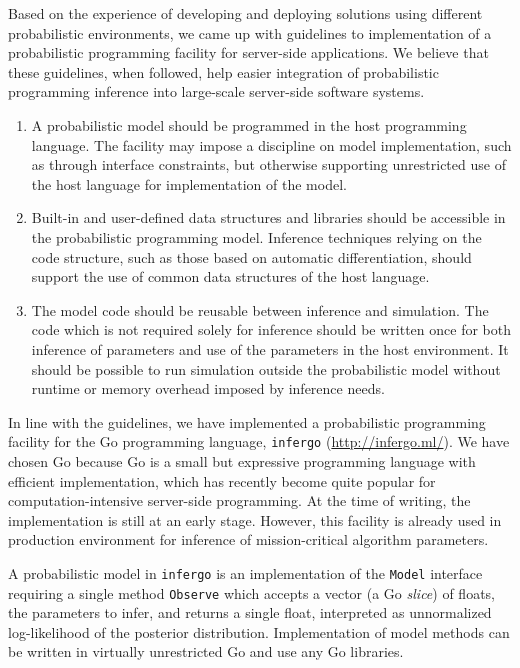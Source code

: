 \documentclass[sigplan,review]{acmart}\settopmatter{printfolios=true,printccs=false,printacmref=false}
\begin{document}
\begin{sloppypar}
Based on the experience of developing and deploying solutions
using different probabilistic environments, we came up with
guidelines to implementation of a probabilistic programming
facility for server-side applications. We believe that these
guidelines, when followed, help easier integration of
probabilistic programming inference into large-scale server-side
software systems.

\begin{enumerate}
\item A probabilistic model should be programmed in the host
programming language. The facility may impose a discipline on
model implementation, such as through interface constraints, but
otherwise supporting unrestricted use of the host language for
implementation of the model.

\item Built-in and user-defined data structures and libraries
should be accessible in the probabilistic programming model.
Inference techniques relying on the code structure, such as
those based on automatic differentiation, should support the
use of common data structures of the host language.

\item The model code should be reusable between inference and
simulation. The code which is not required solely for inference
should be written once for both inference of parameters and use
of the parameters in the host environment.  It should be
possible to run simulation outside the probabilistic model without
runtime or memory overhead imposed by inference needs.
\end{enumerate}

In line with the guidelines, we have implemented a probabilistic
programming facility for the Go programming language,
\texttt{infergo} (\url{http://infergo.ml/}). We have chosen Go
because Go is a small but expressive programming language with
efficient implementation, which has recently become quite
popular for computation-intensive server-side programming. At
the time of writing, the implementation is still at an early
stage. However, this facility is already used in production
environment for inference of mission-critical algorithm
parameters.  

A probabilistic model in \texttt{infergo} is an implementation
of the \texttt{Model} interface requiring a single method
\texttt{Observe} which accepts a vector (a Go \textit{slice}) of
floats, the parameters to infer, and returns a single float,
interpreted as unnormalized log-likelihood of the posterior
distribution. Implementation of model methods can be written
in virtually unrestricted Go and use any Go libraries.


\end{sloppypar}
\end{document}
